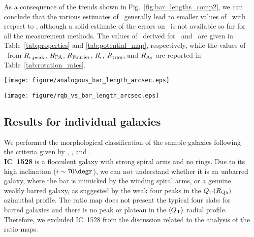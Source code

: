 \documentclass{aa}
\begin{document}
As a consequence of the trends shown in Fig.~\ref{fig:bar_lengths_comp2}, we can conclude that the various estimates of \rbar\ generally lead to smaller values of \rr\ with respect to \rqb, although a solid estimate of the errors on \rbar\ is not available so far for all the measurement methods. The values of \rr\ derived for \rmean\ and \rqb\ are given in Table~\ref{tab:properties} and \ref{tab:potential_map}, respectively, while the values of \rr\ from $R_{\rm \epsilon,peak}$, $R_{\rm PA}$, $R_{\rm Fourier}$, $R_\epsilon$, $R_{\rm tran}$, and $R_{\rm A_2}$ are reported in Table~\ref{tab:rotation_rates}.

\begin{figure*}[!h]
    \centering
    \texttt{[image: figure/analogous\_bar\_length\_arcsec.eps]}
    \caption{Comparison between the bar radius of the sample galaxies obtained with similar methods based on Fourier analysis (left panel), ellipticity (central panel) and PA (right panel) radial profiles.}
    \label{fig:bar_lengths_comp1}
\end{figure*}

\begin{figure*}[!h]
    \centering
    \texttt{[image: figure/rqb\_vs\_bar\_length\_arcsec.eps]}
    \caption{Comparison between the bar radius of the sample galaxies obtained with several methods and the analysis of the ratio maps. The bottom panel shows the comparison between \rmean\ and \rqb\ given in Tables~\ref{tab:properties} and \ref{tab:potential_map}, respectively.}
    \label{fig:bar_lengths_comp2}
\end{figure*}

\subsection{Results for individual galaxies}
\label{app1}

We performed the morphological classification of the sample galaxies following the criteria given by \citet{Buta2015}, \citet{Buta2017}, and \citet{Bittner2020}. \\

\noindent \textbf{IC~1528} is a flocculent galaxy with strong spiral arms and no rings. Due to its high inclination ($i\sim70\degr$), we can not understand whether it is an unbarred galaxy, where the bar is mimicked by the winding spiral arms, or a genuine weakly barred galaxy, as suggested by the weak four peaks in the $Q_{\rm T}(R_{\rm Qb})$ azimuthal profile. The ratio map does not present the typical four slabs for barred galaxies and there is no peak or plateau in the $\langle Q_{\rm T}\rangle$ radial profile. Therefore, we excluded IC~1528 from the discussion related to the analysis of the ratio maps.\\
\end{document}
